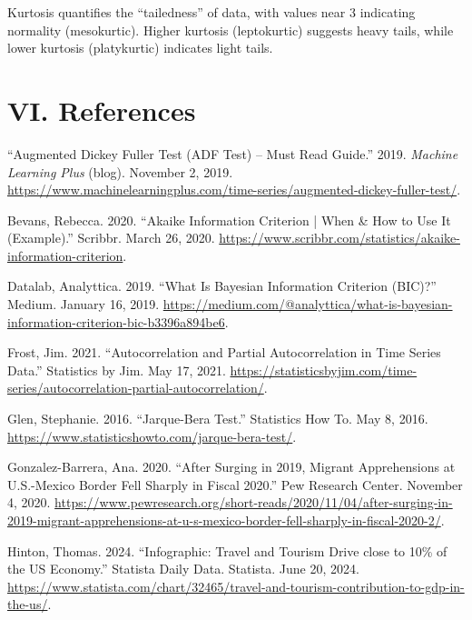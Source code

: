 \documentclass[11pt]{article}
\newenvironment{references}
  {\begin{list}{}{%
      \setlength{\leftmargin}{0.4in}%
      \setlength{\itemindent}{-0.4in}%
      \setlength{\itemsep}{0.6\baselineskip}%
      \setlength{\parsep}{0pt}%
  }}
  {\end{list}}
\begin{document}
Kurtosis quantifies the ``tailedness'' of data, with values near 3 indicating normality (mesokurtic). Higher kurtosis (leptokurtic) suggests heavy tails, while lower kurtosis (platykurtic) indicates light tails.

\clearpage

\section{VI. References}

\begin{references}

\item ``Augmented Dickey Fuller Test (ADF Test) -- Must Read Guide.'' 2019. \emph{Machine Learning Plus} (blog). November 2, 2019. \url{https://www.machinelearningplus.com/time-series/augmented-dickey-fuller-test/}.

\item Bevans, Rebecca. 2020. ``Akaike Information Criterion | When \& How to Use It (Example).'' Scribbr. March 26, 2020. \url{https://www.scribbr.com/statistics/akaike-information-criterion}.

\item Datalab, Analyttica. 2019. ``What Is Bayesian Information Criterion (BIC)?'' Medium. January 16, 2019. \url{https://medium.com/@analyttica/what-is-bayesian-information-criterion-bic-b3396a894be6}.

\item Frost, Jim. 2021. ``Autocorrelation and Partial Autocorrelation in Time Series Data.'' Statistics by Jim. May 17, 2021. \url{https://statisticsbyjim.com/time-series/autocorrelation-partial-autocorrelation/}.

\item Glen, Stephanie. 2016. ``Jarque-Bera Test.'' Statistics How To. May 8, 2016. \url{https://www.statisticshowto.com/jarque-bera-test/}.

\item Gonzalez-Barrera, Ana. 2020. ``After Surging in 2019, Migrant Apprehensions at U.S.-Mexico Border Fell Sharply in Fiscal 2020.'' Pew Research Center. November 4, 2020. \url{https://www.pewresearch.org/short-reads/2020/11/04/after-surging-in-2019-migrant-apprehensions-at-u-s-mexico-border-fell-sharply-in-fiscal-2020-2/}.

\item Hinton, Thomas. 2024. ``Infographic: Travel and Tourism Drive close to 10\% of the US Economy.'' Statista Daily Data. Statista. June 20, 2024. \url{https://www.statista.com/chart/32465/travel-and-tourism-contribution-to-gdp-in-the-us/}.


\end{references}
\end{document}

